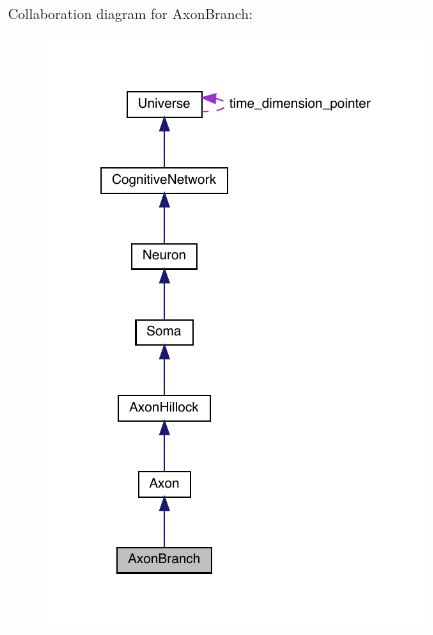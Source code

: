 Collaboration diagram for Axon\+Branch\+:
\nopagebreak
\begin{figure}[H]
\begin{center}
\leavevmode
\includegraphics[width=283pt]{class_axon_branch__coll__graph}
\end{center}
\end{figure}
